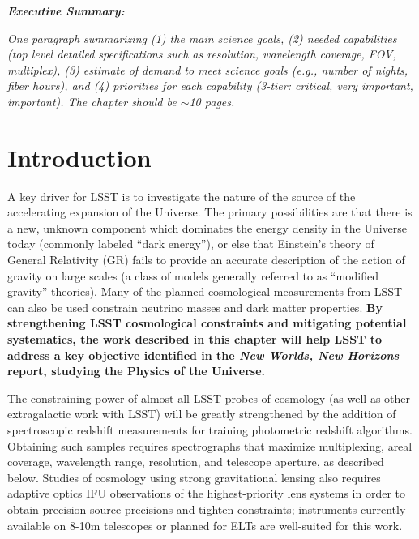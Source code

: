 \documentclass[12pt]{report}
\begin{document}
\pagestyle{fancy}
\fancyfoot{}%
\fancyfoot[R]{\thepage}  %

\fancyhead[R]{}
\renewcommand{\footrulewidth}{1pt}


{\bf{\it Executive Summary:}}

{\it One paragraph summarizing (1) the main science goals, (2) needed capabilities (top level detailed specifications such as resolution, wavelength coverage, FOV, multiplex), (3) estimate of demand to meet science goals (e.g., number of nights, fiber hours), and (4) priorities for each capability (3-tier: critical, very important, important). The chapter should be $\sim$10 pages. }

\section{Introduction}

A key driver for LSST is to investigate the nature of the source of the accelerating expansion of the Universe.  The primary possibilities are that there is a new, unknown component which dominates the energy density in the Universe today (commonly labeled ``dark energy''), or else that Einstein's theory of General Relativity (GR) fails to provide an accurate description of the action of gravity on large scales (a class of models generally referred to as ``modified gravity'' theories).  Many of the planned cosmological measurements from LSST can also be used constrain neutrino masses and dark matter properties.  {\bf By strengthening LSST cosmological constraints and mitigating potential systematics, the work described in this chapter will help LSST to address a key objective identified in the {\it New Worlds, New Horizons} report, studying the Physics of the Universe.}

The constraining power of almost all LSST probes of cosmology (as well as other extragalactic work with LSST) will be greatly strengthened by the addition of spectroscopic redshift measurements for training photometric redshift algorithms.  Obtaining such samples requires spectrographs that maximize multiplexing, areal coverage, wavelength range, resolution, and telescope aperture, as described below.  Studies of cosmology using strong gravitational lensing also requires adaptive optics IFU observations of the highest-priority lens systems in order to obtain precision source precisions and tighten constraints; instruments currently available on 8-10m telescopes or planned for ELTs are well-suited for this work.
\end{document}
